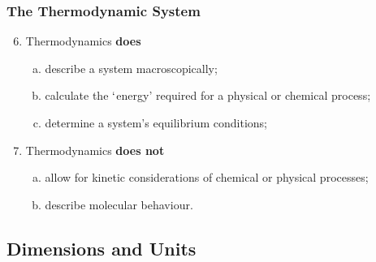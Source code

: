 \documentclass[10pt,compress]{beamer}
\begin{document}
\begin{frame}
 \frametitle{The Thermodynamic System}
  \begin{enumerate}[(1)]\setcounter{enumi}{5}
   \item <1-> Thermodynamics {\bf does}
     \begin{enumerate}[(a)]
       \item<1-> describe a system macroscopically;
       \item<1-> calculate the $\lq$energy' required for a physical or chemical process;
       \item<1-> determine a system's equilibrium conditions;
     \end{enumerate}
   \item<2-> Thermodynamics {\bf does not}
     \begin{enumerate}[(a)]
       \item<2-> allow for kinetic considerations of chemical or physical processes;
       \item<2-> describe molecular behaviour.
     \end{enumerate}
  \end{enumerate}
\end{frame}


\subsection{Dimensions and Units} 
\end{document}
